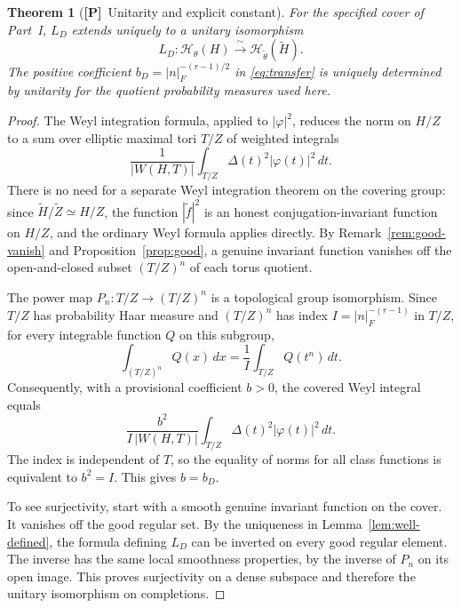 \documentclass[11pt]{article}
\newcommand{\tH}{\widetilde H}
\newcommand{\tZ}{\widetilde Z}
\newcommand{\Ptag}{\textnormal{\textbf{[P]}}}
\theoremstyle{plain}
\newtheorem{theorem}{Theorem}[section]
\theoremstyle{definition}
\begin{document}
\begin{theorem}[\Ptag\ Unitarity and explicit constant]\label{thm:unitary}
For the specified cover of Part~I, $L_D$ extends uniquely to a unitary isomorphism
\begin{equation}\label{eq:unitary}
L_D:\mathcal H_\theta(H)\xrightarrow{\ \sim\ }\mathcal H_{\widetilde\theta}(\tH).
\end{equation}
The positive coefficient $b_D=|n|_F^{-(r-1)/2}$ in \eqref{eq:transfer} is uniquely determined by unitarity for the quotient probability measures used here.
\end{theorem}
\begin{proof}
The Weyl integration formula, applied to $|\varphi|^2$, reduces the norm on $H/Z$ to a sum over elliptic maximal tori $T/Z$ of weighted integrals
\[
\frac{1}{|W(H,T)|}\int_{T/Z}\Delta(t)^2|\varphi(t)|^2\,dt.
\]
There is no need for a separate Weyl integration theorem on the covering group: since $\tH/\tZ\simeq H/Z$, the function $|\widetilde f|^2$ is an honest conjugation-invariant function on $H/Z$, and the ordinary Weyl formula applies directly. By Remark~\ref{rem:good-vanish} and Proposition~\ref{prop:good}, a genuine invariant function vanishes off the open-and-closed subset $(T/Z)^n$ of each torus quotient.

The power map $P_n:T/Z\to(T/Z)^n$ is a topological group isomorphism. Since $T/Z$ has probability Haar measure and $(T/Z)^n$ has index $I=|n|_F^{-(r-1)}$ in $T/Z$, for every integrable function $Q$ on this subgroup,
\begin{equation}\label{eq:changevar}
\int_{(T/Z)^n}Q(x)\,dx=\frac1I\int_{T/Z}Q(t^n)\,dt.
\end{equation}
Consequently, with a provisional coefficient $b>0$, the covered Weyl integral equals
\[
\frac{b^2}{I\,|W(H,T)|}\int_{T/Z}\Delta(t)^2|\varphi(t)|^2\,dt.
\]
The index is independent of $T$, so the equality of norms for all class functions is equivalent to $b^2=I$. This gives $b=b_D$.

To see surjectivity, start with a smooth genuine invariant function on the cover. It vanishes off the good regular set. By the uniqueness in Lemma~\ref{lem:well-defined}, the formula defining $L_D$ can be inverted on every good regular element. The inverse has the same local smoothness properties, by the inverse of $P_n$ on its open image. This proves surjectivity on a dense subspace and therefore the unitary isomorphism on completions.
\end{proof}
\end{document}
